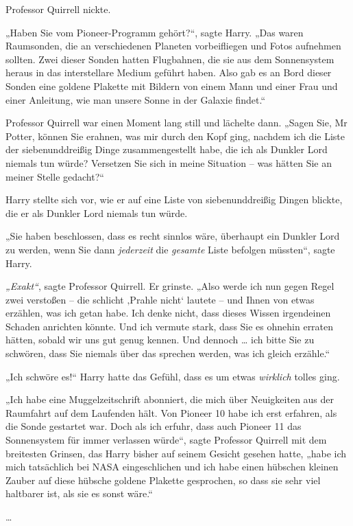 {Professor Quirrell nickte.

„Haben Sie vom Pioneer-Programm gehört?“, sagte Harry. „Das waren Raumsonden, die an verschiedenen Planeten vorbeifliegen und Fotos aufnehmen sollten. Zwei dieser Sonden hatten Flugbahnen, die sie aus dem Sonnensystem heraus in das interstellare Medium geführt haben. Also gab es an Bord dieser Sonden eine goldene Plakette mit Bildern von einem Mann und einer Frau und einer Anleitung, wie man unsere Sonne in der Galaxie findet.“

Professor Quirrell war einen Moment lang still und lächelte dann. „Sagen Sie, Mr Potter, können Sie erahnen, was mir durch den Kopf ging, nachdem ich die Liste der siebenunddreißig Dinge zusammengestellt habe, die ich als Dunkler Lord niemals tun würde? Versetzen Sie sich in meine Situation -- was hätten Sie an meiner Stelle gedacht?“

Harry stellte sich vor, wie er auf eine Liste von siebenunddreißig Dingen blickte, die er als Dunkler Lord niemals tun würde.

„Sie haben beschlossen, dass es recht sinnlos wäre, überhaupt ein Dunkler Lord zu werden, wenn Sie dann \emph{jederzeit} die \emph{gesamte} Liste befolgen müssten“, sagte Harry.

\emph{„Exakt“}, sagte Professor Quirrell. Er grinste. „Also werde ich nun gegen Regel zwei verstoßen -- die schlicht ‚Prahle nicht` lautete -- und Ihnen von etwas erzählen, was ich getan habe. Ich denke nicht, dass dieses Wissen irgendeinen Schaden anrichten könnte. Und ich vermute stark, dass Sie es ohnehin erraten hätten, sobald wir uns gut genug kennen. Und dennoch … ich bitte Sie zu schwören, dass Sie niemals über das sprechen werden, was ich gleich erzähle.“

„Ich schwöre es!“ Harry hatte das Gefühl, dass es um etwas \emph{wirklich} tolles ging.

„Ich habe eine Muggelzeitschrift abonniert, die mich über Neuigkeiten aus der Raumfahrt auf dem Laufenden hält. Von Pioneer 10 habe ich erst erfahren, als die Sonde gestartet war. Doch als ich erfuhr, dass auch Pioneer 11 das Sonnensystem für immer verlassen würde“, sagte Professor Quirrell mit dem breitesten Grinsen, das Harry bisher auf seinem Gesicht gesehen hatte, „habe ich mich tatsächlich bei NASA eingeschlichen und ich habe einen hübschen kleinen Zauber auf diese hübsche goldene Plakette gesprochen, so dass sie sehr viel haltbarer ist, als sie es sonst wäre.“

…

}

